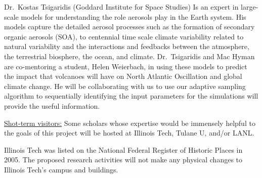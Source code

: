 \documentclass[11pt]{NSFamsart}
\begin{document}
Dr.\  Kostas Tsigaridis (Goddard Institute for Space Studies)  Is an expert in large-scale models for understanding the role aerosols play in the Earth system.  His models 
capture the detailed aerosol processes such as the formation of secondary organic aerosols (SOA), to centennial time scale climate variability related to natural variability and the interactions and feedbacks between the atmosphere, the terrestrial biosphere, the ocean, and climate. Dr.\ Tsigaridis and Mac Hyman are co-mentoring a student, Helen Weierbach, in using these models to predict the impact that volcanoes will have on  North Atlantic Oscillation and global climate change.  He will be collaborating with us to use our adaptive sampling algorithm to sequentially identifying the input parameters for the simulations will provide the useful information.  

\underline{Shot-term visitors:} Some scholars whose expertise would be immensely helpful to the goals of this project will be hosted at Illinois Tech, Tulane U, and/or LANL.

\bigskip \bigskip

Illinois Tech was listed on the National Federal Register of Historic Places in 2005. The proposed 
research activities will not make any physical changes to Illinois Tech's campus and buildings.
\end{document}
